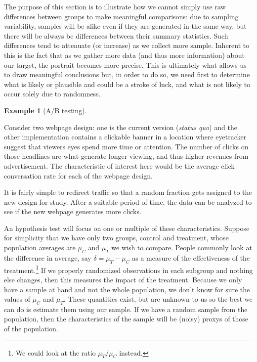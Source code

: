 \documentclass[
  11pt,
  letterpaper,
]{scrbook}
\theoremstyle{definition}
\newtheorem{example}{Example}[chapter]
\theoremstyle{remark}
\begin{document}
The purpose of this section is to illustrate how we cannot simply use
raw differences between groups to make meaningful comparisons: due to
sampling variability, samples will be alike even if they are generated
in the same way, but there will be always be differences between their
summary statistics. Such differences tend to attenuate (or increase) as
we collect more sample. Inherent to this is the fact that as we gather
more data (and thus more information) about our target, the portrait
becomes more precise. This is ultimately what allows us to draw
meaningful conclusions but, in order to do so, we need first to
determine what is likely or plausible and could be a stroke of luck, and
what is not likely to occur solely due to randomness.

\begin{example}[A/B
testing]\protect\hypertarget{exm-ABtest}{}\label{exm-ABtest}

Consider two webpage design: one is the current version (\emph{status
quo}) and the other implementation contains a clickable banner in a
location where eyetracker suggest that viewers eyes spend more time or
attention. The number of clicks on those headlines are what generate
longer viewing, and thus higher revenues from advertisement. The
characteristic of interest here would be the average click conversation
rate for each of the webpage design.

It is fairly simple to redirect traffic so that a random fraction gets
assigned to the new design for study. After a suitable period of time,
the data can be analyzed to see if the new webpage generates more
clicks.

\end{example}

An hypothesis test will focus on one or multiple of these
characteristics. Suppose for simplicity that we have only two groups,
control and treatment, whose population averages are \(\mu_C\) and
\(\mu_T\) we wish to compare. People commonly look at the difference in
average, say \(\delta=\mu_T - \mu_C\) as a measure of the effectiveness
of the treatment.\footnote{We could look at the ratio \(\mu_T/\mu_C\)
  instead.} If we properly randomized observations in each subgroup and
nothing else changes, then this measures the impact of the treatment.
Because we only have a sample at hand and not the whole population, we
don't know for sure the values of \(\mu_C\) and \(\mu_T\). These
quantities exist, but are unknown to us so the best we can do is
estimate them using our sample. If we have a random sample from the
population, then the characteristics of the sample will be (noisy)
proxys of those of the population.
\end{document}
